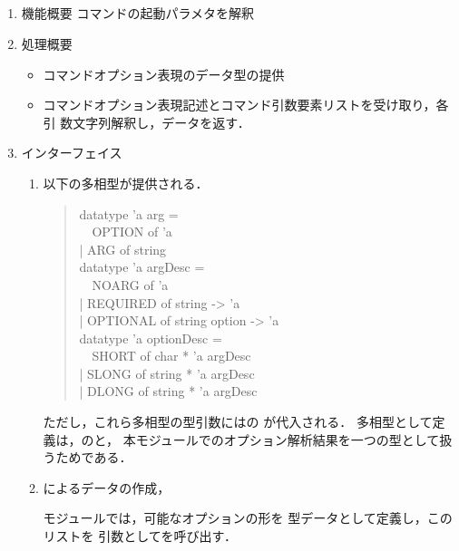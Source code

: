\subsection{}
\begin{enumerate}
\item 機能概要 \smlsharp{}コマンドの起動パラメタを解釈
\item 処理概要 
\begin{itemize}
\item コマンドオプション表現のデータ型の提供
\item コマンドオプション表現記述とコマンド引数要素リストを受け取り，各引
数文字列解釈し，データを返す．
\end{itemize}
\item インターフェイス 
\begin{enumerate}
\item 以下の多相型が提供される．
\begin{quote}
\begin{tt}
  datatype 'a arg =\\
\myem\ \ OPTION of 'a\\
\myem    | ARG of string\\
  datatype 'a argDesc =\\
\myem\ \     NOARG of 'a\\
\myem    | REQUIRED of string -> 'a\\
\myem    | OPTIONAL of string option -> 'a\\
  datatype 'a optionDesc =\\
\myem\ \       SHORT of char * 'a argDesc\\
\myem    | SLONG of string * 'a argDesc\\
\myem    | DLONG of string * 'a argDesc
\end{tt}
\end{quote}
	ただし，これら多相型の型引数にはの
が代入される．
	多相型として定義は，のと，
本モジュールでのオプション解析結果を一つの型として扱うためである．
\item {}によるデータの作成，

	モジュールでは，可能なオプションの形を
型データとして定義し，このリストを
引数としてを呼び出す．
\end{enumerate}
\end{enumerate}

